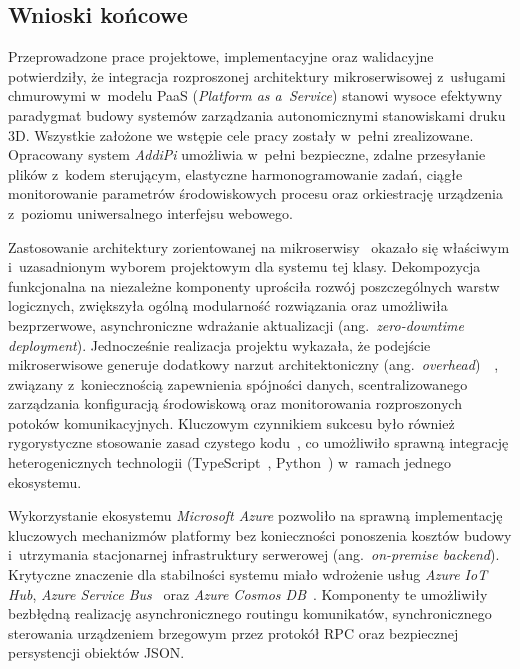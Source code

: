 \documentclass[a4paper,12pt,reqno]{article}
\begin{document}
\subsection{Wnioski końcowe}

Przeprowadzone prace projektowe, implementacyjne oraz walidacyjne potwierdziły, że integracja rozproszonej architektury mikroserwisowej z~usługami chmurowymi w~modelu PaaS (\textit{Platform as a~Service}) stanowi wysoce efektywny paradygmat budowy systemów zarządzania autonomicznymi stanowiskami druku 3D. Wszystkie założone we wstępie cele pracy zostały w~pełni zrealizowane. Opracowany system \textit{AddiPi} umożliwia w~pełni bezpieczne, zdalne przesyłanie plików z~kodem sterującym, elastyczne harmonogramowanie zadań, ciągłe monitorowanie parametrów środowiskowych procesu oraz orkiestrację urządzenia z~poziomu uniwersalnego interfejsu webowego.

Zastosowanie architektury zorientowanej na mikroserwisy~\cite{newman2022} okazało się właściwym i~uzasadnionym wyborem projektowym dla systemu tej klasy. Dekompozycja funkcjonalna na niezależne komponenty uprościła rozwój poszczególnych warstw logicznych, zwiększyła ogólną modularność rozwiązania oraz umożliwiła bezprzerwowe, asynchroniczne wdrażanie aktualizacji (ang.~\textit{zero-downtime deployment}). Jednocześnie realizacja projektu wykazała, że podejście mikroserwisowe generuje dodatkowy narzut architektoniczny (ang.~\textit{overhead})~\cite{kleppmann2017}~\cite{richardson2020}, związany z~koniecznością zapewnienia spójności danych, scentralizowanego zarządzania konfiguracją środowiskową oraz monitorowania rozproszonych potoków komunikacyjnych. Kluczowym czynnikiem sukcesu było również rygorystyczne stosowanie zasad czystego kodu~\cite{martin2022}, co umożliwiło sprawną integrację heterogenicznych technologii (TypeScript~\cite{typescript}, Python~\cite{python}) w~ramach jednego ekosystemu.

Wykorzystanie ekosystemu \textit{Microsoft Azure} pozwoliło na sprawną implementację kluczowych mechanizmów platformy bez konieczności ponoszenia kosztów budowy i~utrzymania stacjonarnej infrastruktury serwerowej (ang.~\textit{on-premise backend}). Krytyczne znaczenie dla stabilności systemu miało wdrożenie usług \textit{Azure IoT Hub}, \textit{Azure Service Bus}~\cite{servicebus} oraz \textit{Azure Cosmos DB}~\cite{cosmosdb}. Komponenty te umożliwiły bezbłędną realizację asynchronicznego routingu komunikatów, synchronicznego sterowania urządzeniem brzegowym przez protokół RPC oraz bezpiecznej persystencji obiektów JSON.
\end{document}
